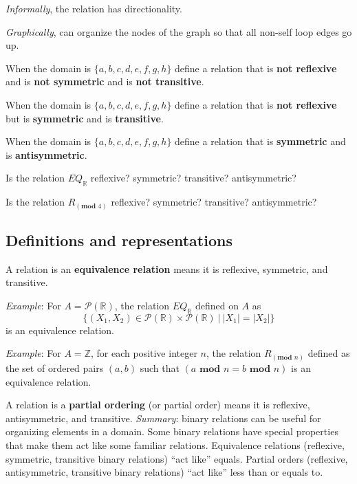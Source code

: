 \documentclass[12pt, oneside]{article}
\begin{document}
{\it Informally}, the relation has directionality.

{\it Graphically}, can organize the nodes of the graph so that 
all non-self loop edges go up. \vfill
\newpage



When the domain is $\{ a,b,c,d,e,f,g,h\}$ define a relation that is {\bf not reflexive} and 
is {\bf not symmetric} and is {\bf not transitive}.

\vfill

When the domain is $\{ a,b,c,d,e,f,g,h\}$ define a relation that is {\bf not reflexive} but 
is {\bf symmetric} and is {\bf transitive}.

\vfill

When the domain is $\{ a,b,c,d,e,f,g,h\}$ define a relation that is {\bf symmetric} and
is {\bf antisymmetric}.

\vfill

Is the relation $EQ_{\mathbb{R}}$ reflexive? symmetric? transitive? antisymmetric?

\vfill

Is the relation $R_{(\textbf{mod } 4)}$ reflexive? symmetric? transitive? antisymmetric?

\vfill
%
 \vfill

\newpage
\subsection*{Definitions and representations}


A relation is an {\bf equivalence relation} means it is reflexive, symmetric, and transitive. 


{\it Example}: For $A = \mathcal{P}(\mathbb{R})$, the relation $EQ_{\mathbb{R}}$ defined on $A$ as 
\[
\{ (X_1, X_2 ) \in\mathcal{P}(\mathbb{R})  \times \mathcal{P}(\mathbb{R}) ~|~ |X_1| = |X_2| \}
\]
is an equivalence relation.

\vfill

{\it Example}: For $A = \mathbb{Z}$, for each positive integer $n$, the relation $R_{(\textbf{mod } n)}$ defined as the set of ordered pairs $(a, b)$ such that $(a \textbf{ mod } n = b \textbf{ mod } n)$ is an equivalence relation.
\vfill 

A relation is a {\bf partial ordering} (or partial order) means 
it is reflexive, antisymmetric, and transitive. {\it Summary}: binary relations can be useful for organizing elements in a domain. 
Some binary relations have special properties that make them act like some familiar relations.
Equivalence relations (reflexive, symmetric, transitive binary relations) ``act like'' equals.
Partial orders (reflexive, antisymmetric, transitive binary relations) ``act like'' less than or equals to.
\end{document}

